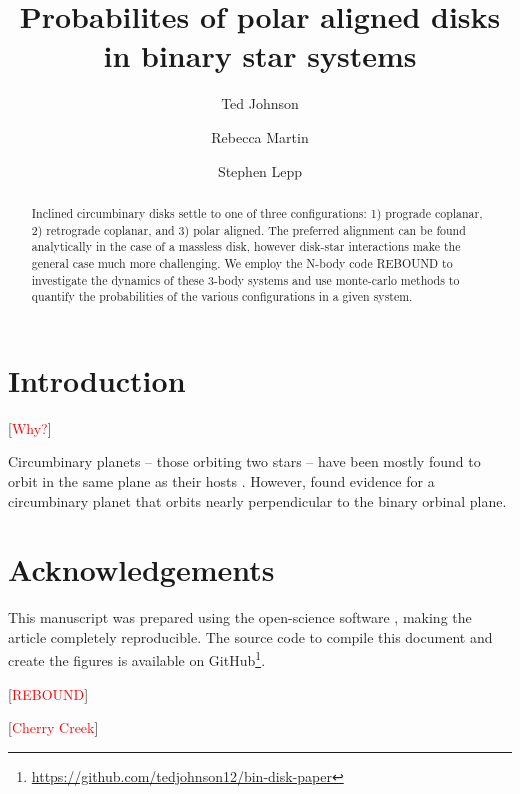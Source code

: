 \documentclass[twocolumn]{aastex631}
\newcommand\ghurl[0]{\url{https://github.com/tedjohnson12/bin-disk-paper}}
\begin{document}
\title{Probabilites of polar aligned disks in binary star systems}

\author{Ted Johnson}
\author{Rebecca Martin}
\author{Stephen Lepp}

\begin{abstract}
    Inclined circumbinary disks settle to one of three configurations: 1) prograde coplanar,
    2) retrograde coplanar, and 3) polar aligned. The preferred alignment can be found analytically
    in the case of a massless disk, however disk-star interactions make the general case much more challenging.
    We employ the N-body code REBOUND to investigate the dynamics of these 3-body systems and use monte-carlo methods
    to quantify the probabilities of the various configurations in a given system.
\end{abstract}

\section{Introduction}
\label{sec:intro}

[\textcolor{red}{Why?}]

Circumbinary planets -- those orbiting two stars -- have been mostly found to orbit in the same plane as
their hosts \citep{2011Sci...333.1602D,2012ApJ...758...87O,2012Natur.481..475W}. However, \citet{2023ApJ...957L..28M}
found evidence for a circumbinary planet that orbits nearly perpendicular to the binary orbinal plane.


\section{Acknowledgements}
\label{sec:ack}

This manuscript was prepared using the open-science software \href{https://show-your.work/en/latest/intro/}{\showyourwork} \citep{Luger2021}, making the article completely
reproducible. The source code to compile this document and create the figures is available on GitHub\footnote{\ghurl}.

[\textcolor{red}{REBOUND}]

[\textcolor{red}{Cherry Creek}]


\end{document}
